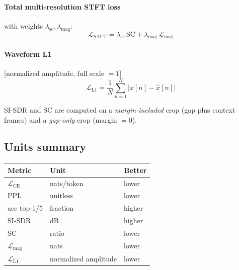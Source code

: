 \documentclass[11pt]{article}
\begin{document}
\paragraph{Total multi-resolution STFT loss} with weights $\lambda_{\mathrm{sc}},\lambda_{\mathrm{mag}}$:
\begin{equation}
\mathcal{L}_{\mathrm{STFT}}=\lambda_{\mathrm{sc}}\,\mathrm{SC}+\lambda_{\mathrm{mag}}\,\mathcal{L}_{\mathrm{mag}}
\end{equation}

\paragraph{Waveform L1} [normalized amplitude, full scale $=1$]
\begin{equation}
\mathcal{L}_{\mathrm{L1}}=\frac{1}{N}\sum_{n=1}^{N}\big|x[n]-\hat{x}[n]\big|
\end{equation}

SI-SDR and SC are computed on a \emph{margin-included} crop (gap plus context frames) and a \emph{gap-only} crop (margin $=0$).

\subsection*{Units summary}
\begin{center}
\begin{tabular}{lll}
\toprule
Metric & Unit & Better \\
\midrule
$\mathcal{L}_{\mathrm{CE}}$ & nats/token & lower \\
PPL & unitless & lower \\
acc top-1/5 & fraction & higher \\
SI-SDR & dB & higher \\
SC & ratio & lower \\
$\mathcal{L}_{\mathrm{mag}}$ & nats & lower \\
$\mathcal{L}_{\mathrm{L1}}$ & normalized amplitude & lower \\
\bottomrule
\end{tabular}
\end{center}
\end{document}
